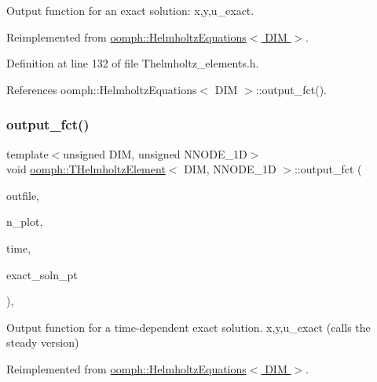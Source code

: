 Output function for an exact solution\+: x,y,u\+\_\+exact. 



Reimplemented from \hyperlink{classoomph_1_1HelmholtzEquations_a18bda8e96ef3abc2d247018592f15f56}{oomph\+::\+Helmholtz\+Equations$<$ D\+I\+M $>$}.



Definition at line 132 of file Thelmholtz\+\_\+elements.\+h.



References oomph\+::\+Helmholtz\+Equations$<$ D\+I\+M $>$\+::output\+\_\+fct().

\mbox{\label{classoomph_1_1THelmholtzElement_a043894a71e2508acf4a34b04469ec64e}} 
\subsubsection{\texorpdfstring{output\+\_\+fct()}{output\_fct()}\hspace{0.1cm}{\footnotesize\ttfamily [2/2]}}
{\footnotesize\ttfamily template$<$unsigned D\+IM, unsigned N\+N\+O\+D\+E\+\_\+1D$>$ \\
void \hyperlink{classoomph_1_1THelmholtzElement}{oomph\+::\+T\+Helmholtz\+Element}$<$ D\+IM, N\+N\+O\+D\+E\+\_\+1D $>$\+::output\+\_\+fct (\begin{DoxyParamCaption}\item[{std\+::ostream \&}]{outfile,  }\item[{const unsigned \&}]{n\+\_\+plot,  }\item[{const double \&}]{time,  }\item[{\hyperlink{classoomph_1_1FiniteElement_ad4ecf2b61b158a4b4d351a60d23c633e}{Finite\+Element\+::\+Unsteady\+Exact\+Solution\+Fct\+Pt}}]{exact\+\_\+soln\+\_\+pt }\end{DoxyParamCaption})\hspace{0.3cm}{\ttfamily [inline]}, {\ttfamily [virtual]}}



Output function for a time-\/dependent exact solution. x,y,u\+\_\+exact (calls the steady version) 



Reimplemented from \hyperlink{classoomph_1_1HelmholtzEquations_abf09295bc42ac5e63b83b3162b94c949}{oomph\+::\+Helmholtz\+Equations$<$ D\+I\+M $>$}.



